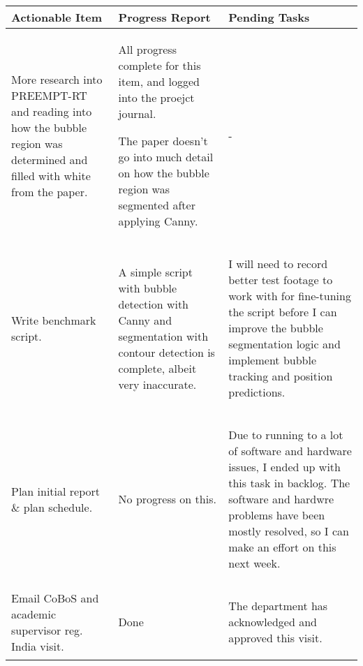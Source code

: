 \begin{table}[!h]
    \centering
    \begin{tabularx}{\textwidth}{|X|X|X|}
        \hline
        Actionable Item & Progress Report & Pending Tasks \\
        \hline
        \hline
        More research into PREEMPT-RT and reading into how the bubble region was determined and filled with white from the paper. & 
        \begin{myitemize}
            \item All progress complete for this item, and logged into the proejct journal.
            \item The paper doesn't go into much detail on how the bubble region was segmented after applying Canny.
        \end{myitemize} & 
        - \\
        \hline
        Write benchmark script. & 
        \begin{myitemize}
            \item A simple script with bubble detection with Canny and segmentation with contour detection is complete, albeit very inaccurate.
        \end{myitemize} & 
        \begin{myitemize}
            \item I will need to record better test footage to work with for fine-tuning the script before I can improve the bubble segmentation logic and implement bubble tracking and position predictions.
        \end{myitemize} \\
        \hline
        Plan initial report \& plan schedule. & 
        \begin{myitemize}
            \item No progress on this.
        \end{myitemize} & 
        \begin{myitemize}
            \item Due to running to a lot of software and hardware issues, I ended up with this task in backlog. The software and hardwre problems have been mostly resolved, so I can make an effort on this next week.
        \end{myitemize} \\
        \hline
        Email CoBoS and academic supervisor reg. India visit. & 
        \begin{myitemize}
            \item Done
        \end{myitemize} & 
        \begin{myitemize}
            \item The department has acknowledged and approved this visit.
        \end{myitemize} \\
        \hline
    \end{tabularx}
\end{table}
